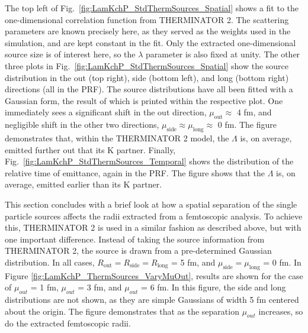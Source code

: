 \documentclass[ALICE,manyauthors]{cernphprep}
\newcommand{\Lam}{$\Lambda$\xspace}
\begin{document}
The top left of Fig.\ \ref{fig:LamKchP_StdThermSources_Spatial} shows a fit to the one-dimensional correlation function from THERMINATOR 2.
The scattering parameters are known precisely here, as they served as the weights used in the simulation, and are kept constant in the fit.
Only the extracted one-dimensional source size is of interest here, so the $\lambda$ parameter is also fixed at unity.
The other three plots in Fig.\ \ref{fig:LamKchP_StdThermSources_Spatial} show the source distribution in the out (top right), side (bottom left), and long (bottom right) directions (all in the PRF).
The source distributions have all been fitted with a Gaussian form, the result of which is printed within the respective plot.
One immediately sees a significant shift in the out direction, $\mu_{\mathrm{out}} \approx$ 4 fm, and negligible shift in the other two directions, $\mu_{\mathrm{side}} \approx \mu_{\mathrm{long}} \approx$ 0 fm.
The figure demonstrates that, within the THERMINATOR 2 model, the \Lam is, on average, emitted further out that its K partner.
Finally, Fig.\ \ref{fig:LamKchP_StdThermSources_Temporal} shows the distribution of the relative time of emittance, again in the PRF.
The figure shows that the \Lam is, on average, emitted earlier than its K partner. 

This section concludes with a brief look at how a spatial separation of the single particle sources affects the radii extracted from a femtoscopic analysis.
To achieve this, THERMINATOR 2 is used in a similar fashion as described above, but with one important difference.
Instead of taking the source information from THERMINATOR 2, the source is drawn from a pre-determined Gaussian distribution.
In all cases, $R_{\mathrm{out}} = R_{\mathrm{side}} = R_{\mathrm{long}}$ = 5 fm, and $\mu_{\mathrm{side}} = \mu_{\mathrm{long}}$ = 0 fm.
In Figure \ref{fig:LamKchP_ThermSources_VaryMuOut}, results are shown for the case of $\mu_{out}$ = 1 fm, $\mu_{out}$ = 3 fm, and $\mu_{out}$ = 6 fm.
In this figure, the side and long distributions are not shown, as they are simple Gaussians of width 5 fm centered about the origin.
The figure demonstrates that as the separation $\mu_{out}$ increases, so do the extracted femtoscopic radii.
\end{document}
